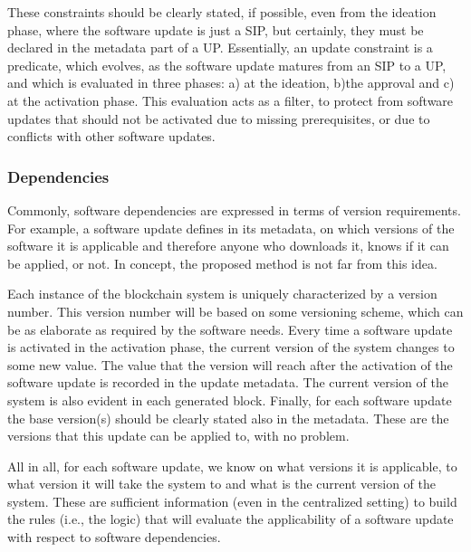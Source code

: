 These constraints should be clearly stated, if possible, even from the ideation phase, where the software update is just a SIP, but certainly, they must be declared in the metadata part of a UP. Essentially, an update  constraint is a predicate, which evolves, as the software update matures from an SIP to a UP,  and which is evaluated in three phases: a) at the ideation, b)the approval and c) at the activation phase. This evaluation acts as a filter, to protect from software updates that should not be activated due to missing prerequisites, or due to conflicts with other software updates.

\subsubsection{Dependencies}
Commonly, software dependencies are expressed in terms of version requirements. For example, a software update defines in its metadata, on which versions of the software it is applicable and therefore anyone who downloads it, knows if it can be applied, or not. In concept, the proposed method is not far from this idea.

Each instance of the blockchain system is uniquely characterized by a version number. This version number will be based on some versioning scheme, which can be as elaborate as required by the software needs. Every time a software update is activated in the activation phase, the current version of the system changes to some new value. The value that the version will reach after the activation of the software update is recorded in the update metadata. The current version of the system is also evident in each generated block. 
 Finally, for each software update the base version(s) should be clearly stated also in the metadata. These are the versions that this update can be applied to, with no problem. 

All in all, for each software update, we know on what versions it is applicable, to what version it will take the system to and what is the current version of the system. These are sufficient information (even in the centralized setting) to build the rules (i.e., the logic) that will evaluate the applicability of a software update with respect to software dependencies.

%
%

